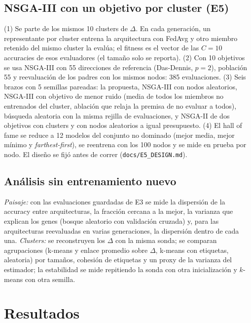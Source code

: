 \documentclass[11pt,a4paper]{article}
\begin{document}
\subsection*{NSGA-III con un objetivo por cluster (E5)}
(1) Se parte de los mismos 10 clusters de $\Delta$. En cada generación, un representante por cluster entrena la arquitectura con FedAvg y otro miembro retenido del mismo cluster la evalúa; el fitness es el vector de las $C=10$ accuracies de esos evaluadores (el tamaño solo se reporta). (2) Con 10 objetivos se usa NSGA-III con 55 direcciones de referencia (Das-Dennis, $p=2$), población 55 y reevaluación de los padres con los mismos nodos: 385 evaluaciones. (3) Seis brazos con 5 semillas pareadas: la propuesta, NSGA-III con nodos aleatorios, NSGA-III con objetivo de menor ruido (media de todos los miembros no entrenados del cluster, ablación que relaja la premisa de no evaluar a todos), búsqueda aleatoria con la misma rejilla de evaluaciones, y NSGA-II de dos objetivos con clusters y con nodos aleatorios a igual presupuesto. (4) El hall of fame se reduce a 12 modelos del conjunto no dominado (mejor media, mejor mínimo y \emph{farthest-first}), se reentrena con los 100 nodos y se mide en prueba por nodo. El diseño se fijó antes de correr (\texttt{docs/E5\_DESIGN.md}).

\subsection*{Análisis sin entrenamiento nuevo}
\emph{Paisaje:} con las evaluaciones guardadas de E3 se mide la dispersión de la accuracy entre arquitecturas, la fracción cercana a la mejor, la varianza que explican los genes (bosque aleatorio con validación cruzada) y, para las arquitecturas reevaluadas en varias generaciones, la dispersión dentro de cada una. \emph{Clusters:} se reconstruyen los $\Delta$ con la misma sonda; se comparan agrupaciones (k-means y enlace promedio sobre $\Delta$, k-means con etiquetas, aleatoria) por tamaños, cohesión de etiquetas y un proxy de la varianza del estimador; la estabilidad se mide repitiendo la sonda con otra inicialización y $k$-means con otra semilla.

\section{Resultados}
\end{document}
